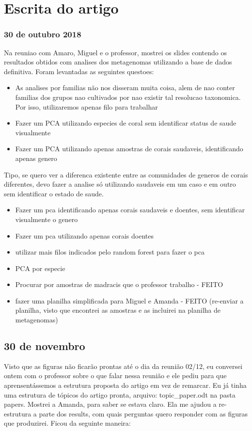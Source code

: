 \documentclass[12pt, a4paper]{report}
\begin{document}
\chapter{Escrita do artigo}

\subsection{30 de outubro 2018}
Na reuniao com Amaro, Miguel e o professor, mostrei os slides contendo os resultados obtidos com analises dos metagenomas utilizando a base de dados definitiva. Foram levantadas as seguintes questoes:
\begin{itemize}
\item As analises por familias não nos disseram muita coisa, alem de nao conter familias dos grupos nao cultivados por nao existir tal resolucao taxonomica. Por isso, utilizaremos apenas filo para trabalhar
\item Fazer um PCA utilizando especies de coral sem identificar status de saude visualmente
\item Fazer um PCA utilizando apenas amostras de corais saudaveis, identificando apenas genero
\end{itemize}
Tipo, se quero ver a diferenca existente entre as comunidades de generos de corais diferentes, devo fazer a analise só utilizando saudaveis em um caso e em outro sem identificar o estado de saude.

\begin{itemize}
\item Fazer um pca identificando apenas corais saudaveis e doentes, sem identificar visualmente o genero 
\item Fazer um pca utilizando apenas corais doentes
\item utilizar mais filos indicados pelo random forest para fazer o pca
\item PCA por especie
\item Procurar por amostras de madracis que o professor trabalho - FEITO
\item fazer uma planilha simplificada para Miguel e Amanda - FEITO (re-enviar a planilha, visto que encontrei as amostras e as incluirei na planilha de metagenomas)
\end{itemize}

\section{30 de novembro}
Visto que as figuras não ficarão prontas até o dia da reunião 02/12, eu conversei ontem com o professor sobre o que falar nessa reunião e ele pediu para que aprensentássemos a estrutura proposta do artigo em vez de remarcar. Eu já tinha uma estrutura de tópicos do artigo pronta, arquivo: topic\_paper.odt na pasta papers. Mostrei a Amanda, para saber se estava claro. Ela me ajudou a re-estrutura a parte dos results, com quais perguntas quero responder com as figuras que produzirei. Ficou da seguinte maneira:\\
\end{document}

